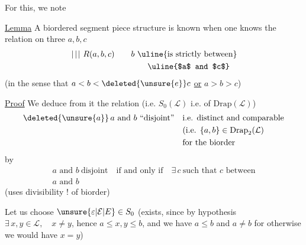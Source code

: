 For this, we note 

\uline{Lemma} A  biordered segment piece structure is known when one knows the relation on  three  $a,b,c$
\[
\begin{aligned}
\left.\vphantom{\substack{X\\X}}\right|\!\left.\vphantom{\substack{X\\X}}\right|\!\left.\vphantom{\substack{X\\X}}\right|\, R(a,b,c)
&\qquad b\ \text{\uline{is strictly between}}\\
&\qquad\qquad\text{\uline{$a$ and $c$}}
\end{aligned}
\]
(in the sense that $a<b<\deleted{\unsure{e}}c$ \uline{or} $a>b>c$)

\uline{Proof}  We deduce from it the relation (i.e.  $S_0(\mathcal L)$\deleted{\unsure{)}} i.e. of $\mathrm{Drap}(\mathcal L)$)
\[
\begin{aligned}
\deleted{\unsure{a}}\,a\text{ and }b\ \text{``disjoint''}\quad&
\text{i.e. distinct and comparable}\\
&\text{(i.e. }\{a,b\}\in\mathrm{Drap}_2(\mathcal L)\\
&\text{for the biorder}
\end{aligned}
\]
by 
\[
\begin{aligned}
a\text{ and }b\ \text{disjoint}\quad \text{if and only if}\quad
\exists\,c\ \text{such that }c\text{ between}\\
a\text{ and }b
\end{aligned}
\]
(uses divisibility ! of   biorder)

 Let us choose $\unsure{\varepsilon|\mathcal E|E}\in S_0$ (exists, since  by hypothesis $\exists\,x,y\in\mathcal L,\quad x\ne y$, hence $a\leq x,y\leq b$, and we have $a\leq b$ and $a\ne b$ \deleted{\unsure{)}} for otherwise we would have $x=y$)

